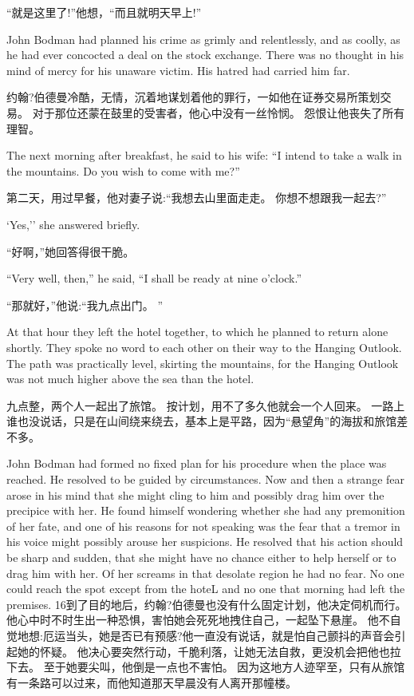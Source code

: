 \documentclass[cs4size, a4paper, 12pt]{article}
\newcounter{numpar}
\newcommand*{\newpar}{\numpar{}}
\begin{document}
	``就是这里了!''他想，``而且就明天早上!''
	
	\newpar John Bodman had planned his crime as grimly and relentlessly, and as coolly, as he had ever concocted a deal on the stock exchange. There was no thought in his mind of mercy for his unaware victim. His hatred had carried him far.
	
	约翰?伯德曼冷酷，无情，沉着地谋划着他的罪行，一如他在证券交易所策划交易。 对于那位还蒙在鼓里的受害者，他心中没有一丝怜悯。 怨恨让他丧失了所有理智。 
	
	\newpar The next morning after breakfast, he said to his wife: ``I intend to take a walk in the mountains. Do you wish to come with me?''
	
	第二天，用过早餐，他对妻子说:``我想去山里面走走。 你想不想跟我一起去?''
	
	`Yes,'' she answered briefly.
	
	``好啊，''她回答得很干脆。 
	
	\newpar ``Very well, then,'' he said, ``I shall be ready at nine o'clock.''
	
	``那就好，''他说:``我九点出门。 ''
	
	\newpar At that hour they left the hotel together, to which he planned to return alone shortly. They spoke no word to each other on their way to the Hanging Outlook. The path was practically level, skirting the mountains, for the Hanging Outlook was not much higher above the sea than the hotel.
	
	九点整，两个人一起出了旅馆。 按计划，用不了多久他就会一个人回来。 一路上谁也没说话，只是在山间绕来绕去，基本上是平路，因为``悬望角''的海拔和旅馆差不多。 
	
	\newpar John Bodman had formed no fixed plan for his procedure when the place was reached. He resolved to be guided by circumstances. Now and then a strange fear arose in his mind that she might cling to him and possibly drag him over the precipice with her. He found himself wondering whether she had any premonition of her fate, and one of his reasons for not speaking was the fear that a tremor in his voice might possibly arouse her suspicions. He resolved that his action should be sharp and sudden, that she might have no chance either to help herself or to drag him with her. Of her screams in that desolate region he had no fear. No one could reach the spot except from the hoteL and no one that morning had left the premises.   16到了目的地后，约翰?伯德曼也没有什么固定计划，他决定伺机而行。 他心中时不时生出一种恐惧，害怕她会死死地拽住自己，一起坠下悬崖。 他不自觉地想:厄运当头，她是否已有预感?他一直没有说话，就是怕自己颤抖的声音会引起她的怀疑。 他决心要突然行动，千脆利落，让她无法自救，更没机会把他也拉下去。 至于她要尖叫，他倒是一点也不害怕。 因为这地方人迹罕至，只有从旅馆有一条路可以过来，而他知道那天早晨没有人离开那幢楼。 
	
\end{document}
